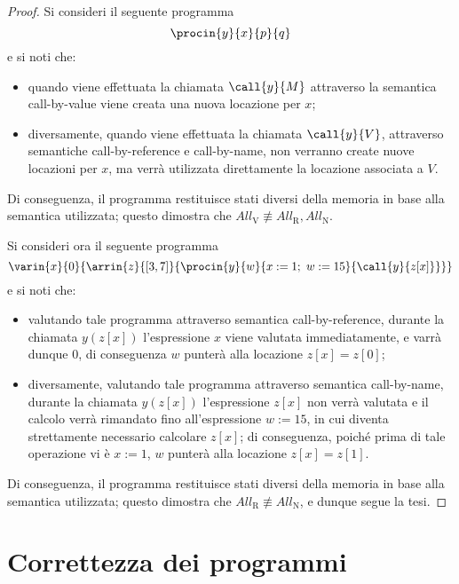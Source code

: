 \documentclass[a4paper, 12pt]{report}
\begin{document}
    \begin{proof}
        Si consideri il seguente programma $$\procin{y}{x}{p}{q}$$ e si noti che:
        
        \begin{itemize}
            \item quando viene effettuata la chiamata $\call{y}{M}$ attraverso la semantica call-by-value viene creata una nuova locazione per $x$;
            \item diversamente, quando viene effettuata la chiamata $\call{y}{V}$, attraverso semantiche call-by-reference e call-by-name, non verranno create nuove locazioni per $x$, ma verrà utilizzata direttamente la locazione associata a $V$.
        \end{itemize}

        Di conseguenza, il programma restituisce stati diversi della memoria in base alla semantica utilizzata; questo dimostra che $All_\mathrm{V} \not\equiv All_\mathrm{R}, All_\mathrm{N}$.

        Si consideri ora il seguente programma $$\varin{x}{0}{\arrin{z}{[3, 7]}{\procin{y}{w}{x := 1; \ w := 15}{\call{y}{z[x]}}}}$$ e si noti che:

        \begin{itemize}
            \item valutando tale programma attraverso semantica call-by-reference, durante la chiamata $y(z[x])$ l'espressione $x$ viene valutata immediatamente, e varrà dunque $0$,  di conseguenza $w$ punterà alla locazione $z[x] = z[0]$;
            \item diversamente, valutando tale programma attraverso semantica call-by-name, durante la chiamata $y(z[x])$ l'espressione $z[x]$ non verrà valutata e il calcolo verrà rimandato fino all'espressione $w := 15$, in cui diventa strettamente necessario calcolare $z[x]$; di conseguenza, poiché prima di tale operazione vi è $x := 1$, $w$ punterà alla locazione $z[x] = z[1]$.
        \end{itemize}

        Di conseguenza, il programma restituisce stati diversi della memoria in base alla semantica utilizzata; questo dimostra che $All_\mathrm{R} \not\equiv All_\mathrm{N}$, e dunque segue la tesi.
    \end{proof}

    \chapter{Correttezza dei programmi}
    
\end{document}
